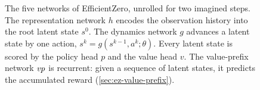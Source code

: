 \begin{figure}[htbp]
  \caption[The EfficientZero architecture]{%
    The five networks of EfficientZero, unrolled for two imagined steps.
    The representation network $h$ encodes the observation history into the root
    latent state $s^0$.
    The dynamics network $g$ advances a latent state by one action,
    $s^k = g(s^{k-1},a^k;\theta)$.
    Every latent state is scored by the policy head $p$ and the value head $v$.
    The value-prefix network $\mathit{vp}$ is recurrent: given a sequence of
    latent states, it predicts the accumulated reward (\cref{sec:ez-value-prefix}).
  }
  \label{fig:ez-architecture}
\end{figure}
